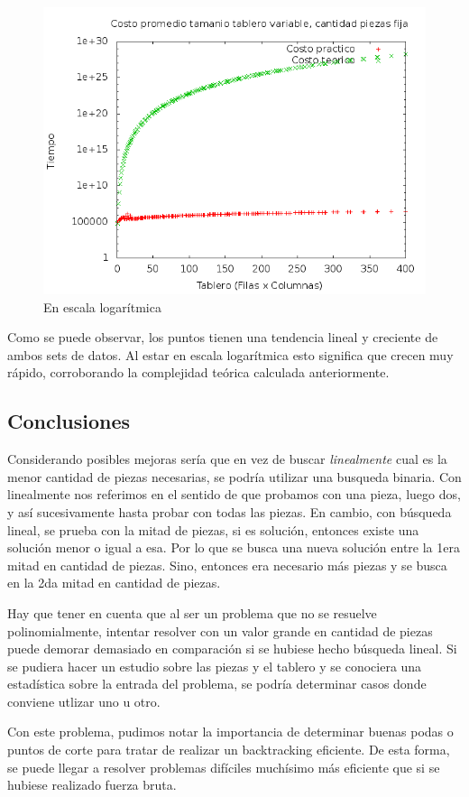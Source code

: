\begin{figure}[H]
	\centering
	\includegraphics[scale=0.6]{ej4-grafico2.png}
	\caption{ En escala logar\'itmica}
\end{figure}

\quad Como se puede observar, los puntos tienen una tendencia lineal y creciente de ambos sets de datos. Al estar en escala logar\'itmica esto significa que crecen muy r\'apido, corroborando la complejidad te\'orica calculada anteriormente.

\subsection{Conclusiones}

\quad Considerando posibles mejoras ser\'ia que en vez de buscar \textit{linealmente} cual es la menor cantidad de piezas necesarias, se podr\'ia utilizar una busqueda binaria. Con linealmente nos referimos en el sentido de que probamos con una pieza, luego dos, y así sucesivamente hasta probar con todas las piezas. En cambio, con b\'usqueda lineal, se prueba con la mitad de piezas, si es soluci\'on, entonces existe una soluci\'on menor o igual a esa. Por lo que se busca una nueva soluci\'on entre la 1era mitad en cantidad de piezas. Sino, entonces era necesario m\'as piezas y se busca en la 2da mitad en cantidad de piezas.

\quad Hay que tener en cuenta que al ser un problema que no se resuelve polinomialmente, intentar resolver con un valor grande en cantidad de piezas puede demorar demasiado en comparaci\'on si se hubiese hecho b\'usqueda lineal. Si se pudiera hacer un estudio sobre las piezas y el tablero y se conociera una estad\'istica sobre la entrada del problema, se podr\'ia determinar casos donde conviene utlizar uno u otro.

\quad Con este problema, pudimos notar la importancia de determinar buenas podas o puntos de corte para tratar de realizar un backtracking eficiente. De esta forma, se puede llegar a resolver problemas dif\'iciles much\'isimo m\'as eficiente que si se hubiese realizado fuerza bruta.
